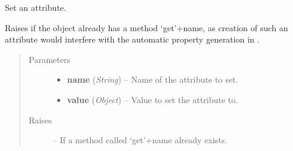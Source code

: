 \documentclass[letterpaper,10pt,english]{sphinxmanual}
\begin{document}
\begin{fulllineitems}
\begin{fulllineitems}
\begin{quote}
\begin{description}
\end{description}\end{quote}

\end{fulllineitems}


\begin{fulllineitems}
\label{eqtools:eqtools.core.PropertyAccessMixin.__setattr__}
Set an attribute.

Raises  if the object already has a method
`get'+name, as creation of such an attribute would interfere with the
automatic property generation in {\hyperref[eqtools:eqtools.core.PropertyAccessMixin.__getattribute__]{}}.
\begin{quote}\begin{description}
\item[{Parameters}] \leavevmode\begin{itemize}
\item {} 
\textbf{name} (\emph{String}) --
Name of the attribute to set.

\item {} 
\textbf{value} (\emph{Object}) --
Value to set the attribute to.

\end{itemize}

\item[{Raises}] \leavevmode
{} -- 
If a method called `get'+name already exists.

\end{description}\end{quote}

\end{fulllineitems}


\end{fulllineitems}

\end{document}
